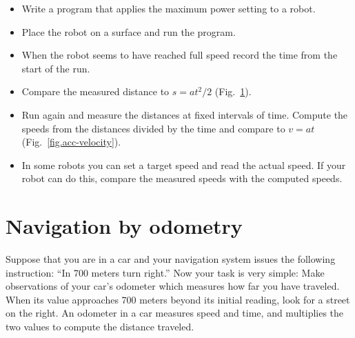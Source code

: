\begin{framed}
\begin{itemize}
\item Write a program that applies the maximum power setting to a robot.
\item Place the robot on a surface and run the program.
\item When the robot seems to have reached full speed record the time from the start of the run.
\item Compare the measured distance to $s = at^2/2$ (Fig.~\ref{fig.acc-distance}).
\item Run again and measure the distances at fixed intervals of time. Compute the speeds from the distances divided by the time and compare to $v=at$ (Fig.~\ref{fig.acc-velocity}).
\item In some robots you can set a target speed and read the actual speed. If your robot can do this, compare the measured speeds with the computed speeds.
\end{itemize}
\end{framed}

\begin{figure}
\subfigures
\begin{minipage}{\textwidth}
\hspace{\fill}
\label{fig.acc-velocity}
\label{fig.acc-distance}
\end{minipage}
\end{figure}

\section{Navigation by odometry}\label{s.odometry}

Suppose that you are in a car and your navigation system issues the following instruction: ``In 700 meters turn right.'' Now your task is very simple: Make observations of your car's odometer which measures how far you have traveled. When its value approaches 700 meters beyond its initial reading, look for a street on the right. An odometer in a car measures speed and time, and multiplies the two values to compute the distance traveled.

